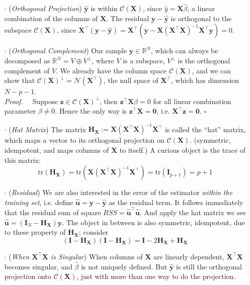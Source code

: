 \documentclass[a4paper, 11pt]{article}
\begin{document}
\begin{itemize}
	\item[$\cdot$] (\emph{Orthogonal Projection}) $\hat{\bm{y}}$ is within $\mathcal{C}(\bm{X})$, since $\hat{y}=\bm{X}\hat{\beta}$, a linear combination of the columns of $\bm{X}$. The residual $\bm{y}-\hat{\bm{y}}$ is orthogonal to the subspace $\mathcal{C}(\bm{X})$, since $\bm{X}^{\top}(\bm{y}-\hat{\bm{y}}) = \bm{X}^{\top}(\bm{y}-\bm{X}(\bm{X}^{\top} \bm{X})^{-1}\bm{X}^{\top} \bm{y}) = 0$.

	\item[$\cdot$] (\emph{Orthogonal Complement}) Our sample $\bm{y} \in \mathbb{R}^N$, which can always be decomposed as $\mathbb{R}^N = V \oplus V^{\perp}$, where $V$ is a subspace, $V^{\perp}$ is the orthogonal complement of $V$. We already have the column space $\mathcal{C}(\bm{X})$, and we can show that $\mathcal{C}(\bm{X})^{\perp} = \mathcal{N}(\bm{X}^{\top})$, the null space of $\bm{X}^{\top}$, which has dimension $N-p-1$. \\
	\textit{Proof.~~} Suppose $\bm{z} \in \mathcal{C}(\bm{X})^{\perp}$, then $\bm{z}^{\top} \bm{X}\beta =0$ for all linear combination parameter $\beta \ne 0$. Hence the only way is $\bm{z}^{\top} \bm{X} = \bm{0}$, i.e. $\bm{X}^{\top} \bm{z} = \bm{0}$. $\square$ \\

	\item[$\cdot$] (\emph{Hat Matrix}) The matrix $\bm{H}_{\bm{X}} := \bm{X}(\bm{X}^{\top} \bm{X})^{-1}\bm{X}^{\top}$ is called the ``hat'' matrix, which maps a vector to its orthogonal projection on $\mathcal{C}(\bm{X})$. (symmetric, idempotent, and maps columns of $\bm{X}$ to itself.) A curious object is the trace of this matrix:
	$$
	\text{tr}(\bm{H}_{\bm{X}}) = \text{tr}(\bm{X}(\bm{X}^{\top} \bm{X})^{-1}\bm{X}^{\top}) = \text{tr}(\bm{I}_{p+1}) = p+1
	$$

	\item[$\cdot$] (\emph{Residual}) We are also interested in the error of the estimator \emph{within the training set}, i.e. define $\hat{\bm{u}}=\bm{y}-\hat{\bm{y}}$ as the residual term. It follows immediately that the residual sum of square $RSS= \hat{\bm{u}}^{\top} \hat{\bm{u}}$. And apply the hat matrix we see $\hat{\bm{u}}=(\bm{I}_N-\bm{H}_{\bm{X}})\bm{y}$. The object in between is also symmetric, idempotent, due to these property of $\bm{H}_{\bm{X}}$; consider
	$$
	(\bm{I}-\bm{H}_{\bm{X}})(\bm{I}-\bm{H}_{\bm{X}}) = \bm{I}-2 \bm{H}_{\bm{X}} + \bm{H}_{\bm{X}}
	$$

	\item[$\cdot$] (\emph{When $\bm{X}^{\top} \bm{X}$ is Singular}) When columns of $\bm{X}$ are linearly dependent, $\bm{X}^{\top} \bm{X}$ becomes singular, and $\hat{\beta}$ is not uniquely defined. But $\hat{\bm{y}}$ is still the orthogonal projection onto $\mathcal{C}(\bm{X})$, just with more than one way to do the projection.
\end{itemize}
\end{document}
